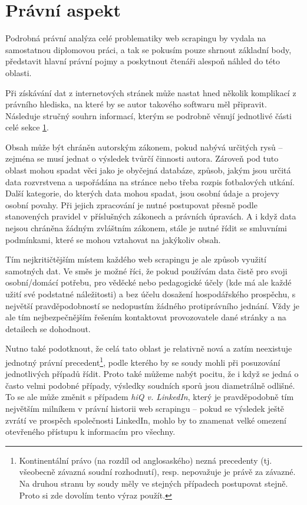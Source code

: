 \documentclass[thesis=B,czech]{FITthesis}[2012/06/26]
\begin{document}

\section{Právní aspekt}
\label{sec:pravni_aspekt}
Podrobná právní analýza celé problematiky web scrapingu by vydala na samostatnou diplomovou práci, a tak se pokusím pouze shrnout základní body, představit hlavní právní pojmy a poskytnout čtenáři alespoň náhled do této oblasti. 

Při získávání dat z internetových stránek může nastat hned několik komplikací z právního hlediska, na které by se autor takového softwaru měl připravit. Následuje stručný souhrn informací, kterým se podrobně věnují jednotlivé části celé sekce \ref{sec:pravni_aspekt}.

Obsah může být chráněn autorským zákonem, pokud nabývá určitých rysů -- zejména se musí jednat o výsledek tvůrčí činnosti autora. Zároveň pod tuto oblast mohou spadat věci jako je obyčejná databáze, způsob, jakým jsou určitá data rozvrstvena a uspořádána na stránce nebo třeba rozpis fotbalových utkání. Další kategorie, do kterých data mohou spadat, jsou osobní údaje a projevy osobní povahy. Při jejich zpracování je nutné postupovat přesně podle stanovených pravidel v příslušných zákonech a právních úpravách. A i když data nejsou chráněna žádným zvláštním zákonem, stále je nutné řídit se smluvními podmínkami, které se mohou vztahovat na jakýkoliv obsah.

Tím nejkritičtějším místem každého web scrapingu je ale způsob využití samotných dat. Ve směs je možné říci, že pokud používám data čistě pro svoji osobní/domácí potřebu, pro věděcké nebo pedagogické účely (kde má ale každé užití své podstatné náležitosti) a bez účelu dosažení hospodářského prospěchu, s největší pravděpodobností se nedopustím žádného protiprávního jednání. Vždy je ale tím nejbezpečnějším řešením kontaktovat provozovatele dané stránky a na detailech se dohodnout.

Nutno také podotknout, že celá tato oblast je relativně nová a zatím neexistuje jednotný právní precedent\footnote{Kontinentální právo (na rozdíl od anglosaského) nezná precedenty (tj. všeobecně závazná soudní rozhodnutí), resp. nepovažuje je právě za závazné. Na druhou stranu by soudy měly ve stejných případech postupovat stejně. Proto si zde dovolím tento výraz použít.}, podle kterého by se soudy mohli při posuzování jednotlivých případů řídit. Proto také můžeme nabýt pocitu, že i když se jedná o často velmi podobné případy, výsledky soudních sporů jsou diametrálně odlišné. To se ale může změnit s případem \emph{hiQ v. LinkedIn}, který je pravděpodobně tím největším milníkem v právní historii web scrapingu -- pokud se výsledek ještě zvrátí ve prospěch společnosti LinkedIn, mohlo by to znamenat velké omezení otevřeného přístupu k informacím pro všechny.
\end{document}
